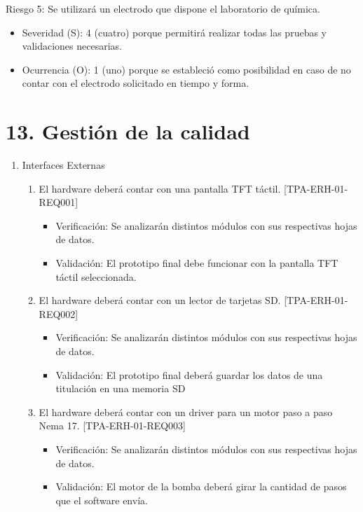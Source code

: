 \documentclass[11pt]{charter}
\begin{document}
Riesgo 5: Se utilizará un electrodo que dispone el laboratorio de química.
\begin{itemize}
\item Severidad (S): 4 (cuatro) porque permitirá realizar todas las pruebas y validaciones necesarias.
\item Ocurrencia (O): 1 (uno) porque se estableció como posibilidad en caso de no contar con el electrodo solicitado en tiempo y forma.
\end{itemize}



\section{13. Gestión de la calidad}
\label{sec:calidad}

\begin{enumerate}
\item Interfaces Externas
	\begin{enumerate}
	\item El hardware deberá contar con una pantalla TFT táctil. [TPA-ERH-01-REQ001]
	\begin{itemize}
\item Verificación: Se analizarán distintos módulos con sus respectivas hojas de datos.\\
\item Validación: El prototipo final debe funcionar con la pantalla TFT táctil seleccionada.\\
\end{itemize}
	\item El hardware deberá contar con un lector de tarjetas SD. [TPA-ERH-01-REQ002]
	\begin{itemize}
\item Verificación: Se analizarán distintos módulos con sus respectivas hojas de datos.\\
\item Validación: El prototipo final deberá guardar los datos de una titulación en una memoria SD\\
\end{itemize}
	\item El hardware deberá contar con un driver para un motor paso a paso Nema 17. [TPA-ERH-01-REQ003]
	\begin{itemize}
\item Verificación: Se analizarán distintos módulos con sus respectivas hojas de datos.\\
\item Validación: El motor de la bomba deberá girar la cantidad de pasos que el software envía.\\

\end{itemize}
\end{enumerate}
\end{enumerate}
\end{document}
